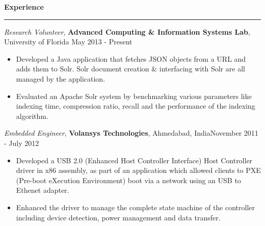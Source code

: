 \documentclass[10pt]{article}
\begin{document}
\textbf{Experience}
\smallskip
\hrule
\textit{Research Volunteer}, {\bf Advanced Computing \& Information Systems Lab}, University of Florida \hfill May 2013 - Present
\begin{itemize}
    \item Developed a Java application that fetches JSON objects from a URL and adds them to Solr. Solr document creation \& interfacing with Solr are all managed by the application. %
    \item Evaluated an Apache Solr system by benchmarking various parameters like indexing time, compression ratio, recall and the performance of the indexing algorithm.
\end{itemize}
\textit{Embedded Engineer}, {\bf Volansys Technologies}, Ahmedabad, India\hfill November 2011 - July 2012
\begin{itemize}
    \item Developed a USB 2.0 (Enhanced Host Controller Interface) Host Controller driver in x86 assembly, as part of an application which allowed clients to PXE (Pre-boot eXecution Environment) boot via a network using an USB to Ethenet adapter. 
    \item Enhanced the driver to manage the complete state machine of the controller including device detection, power management and data transfer. %
\end{itemize}
\end{document}
